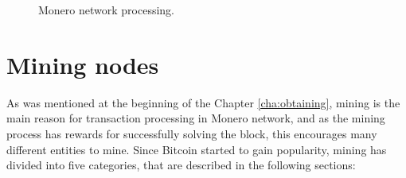 \documentclass[
  printed, %
  table,   %
  lof,     %
  lot,     %
           oneside, color
]{fithesis3}
\begin{document}
\begin{figure}[H]
\caption{Monero network processing.}
\label{pict:network-processing}
\end{figure}
\newpage
\section{Mining nodes}
As was mentioned at the beginning of the Chapter \ref{cha:obtaining}, mining is the main reason for transaction processing in Monero network, and as the mining process has rewards for successfully solving the block, this encourages many different entities to mine.
Since Bitcoin started to gain popularity, mining has divided into five categories, that are described in the following sections:  

\end{document}
